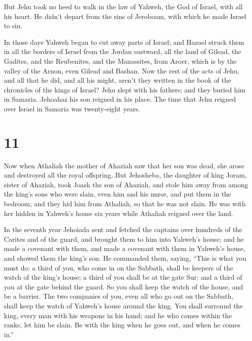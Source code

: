  But Jehu took no heed to walk in the law of Yahweh, the
God of Israel, with all his heart. He didn't depart from the sins of
Jeroboam, with which he made Israel to sin.

 In those days Yahweh began to cut away parts of Israel;
and Hazael struck them in all the borders of Israel  from
the Jordan eastward, all the land of Gilead, the Gadites, and the
Reubenites, and the Manassites, from Aroer, which is by the valley of
the Arnon, even Gilead and Bashan.  Now the rest of the
acts of Jehu, and all that he did, and all his might, aren't they
written in the book of the chronicles of the kings of Israel?
 Jehu slept with his fathers; and they buried him in
Samaria. Jehoahaz his son reigned in his place.  The time
that Jehu reigned over Israel in Samaria was twenty-eight years.

\hypertarget{section-10}{%
\section{11}\label{section-10}}

 Now when Athaliah the mother of Ahaziah saw that her son
was dead, she arose and destroyed all the royal offspring.
 But Jehosheba, the daughter of king Joram, sister of
Ahaziah, took Joash the son of Ahaziah, and stole him away from among
the king's sons who were slain, even him and his nurse, and put them in
the bedroom; and they hid him from Athaliah, so that he was not slain.
 He was with her hidden in Yahweh's house six years while
Athaliah reigned over the land.

 In the seventh year Jehoiada sent and fetched the
captains over hundreds of the Carites and of the guard, and brought them
to him into Yahweh's house; and he made a covenant with them, and made a
covenant with them in Yahweh's house, and showed them the king's son.
 He commanded them, saying, ``This is what you must do: a
third of you, who come in on the Sabbath, shall be keepers of the watch
of the king's house;  a third of you shall be at the gate
Sur; and a third of you at the gate behind the guard. So you shall keep
the watch of the house, and be a barrier.  The two
companies of you, even all who go out on the Sabbath, shall keep the
watch of Yahweh's house around the king.  You shall
surround the king, every man with his weapons in his hand; and he who
comes within the ranks, let him be slain. Be with the king when he goes
out, and when he comes in.''

